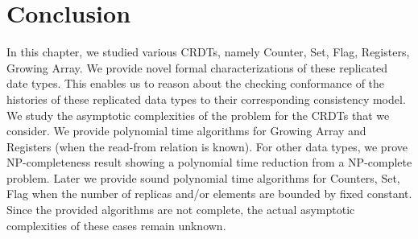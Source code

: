 \section{Conclusion}
\label{sec:crdt:conclusion}

In this chapter, we studied various CRDTs, namely Counter, Set, Flag, Registers, Growing Array. We provide novel formal characterizations of these replicated date types. This enables us to reason about the checking conformance of the histories of these replicated data types to their corresponding consistency model. We study the asymptotic complexities of the problem for the CRDTs that we consider. We provide polynomial time algorithms for Growing Array and Registers (when the read-from relation is known). For other data types, we prove NP-completeness result showing a polynomial time reduction from a NP-complete problem. Later we provide sound polynomial time algorithms for Counters, Set, Flag when the number of replicas and/or elements are bounded by fixed constant. Since the provided algorithms are not complete, the actual asymptotic complexities of these cases remain unknown.